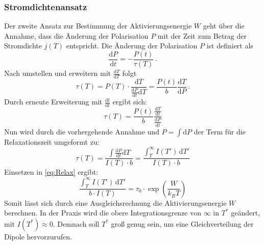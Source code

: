 \subsubsection{Stromdichtenansatz}
Der zweite Ansatz zur Bestimmung der Aktivierungsenergie $W$ geht über die Annahme,
dass die Änderung der Polarisation $P$ mit der Zeit zum Betrag der Stromdichte $j(T)$
entspricht.
Die Änderung der Polarisation $P$ ist definiert als
\begin{equation*}
    \frac{\text{d}P}{\text{d}t} = -\frac{P(t)}{\tau(T)}\, .
\end{equation*}
Nach umstellen und erweitern mit $\frac{\text{d}T}{\text{d}T}$ folgt 
\begin{equation*}
    \tau(T) = P(T) \cdot \frac{\text{d}T}{\frac{\text{d}P}{\text{d}t}\text{d}T } =  \frac{P(t)}{b} \frac{\text{d}T}{\text{d}P}\,.
\end{equation*}
Durch erneute Erweiterung mit $\frac{\text{d}t}{\text{d}t}$ ergibt sich:
\begin{equation*}
    \tau(T) = \frac{P(t)}{b} \frac{\frac{\text{d}T}{\text{d}t}}{\frac{\text{d}P}{\text{d}t}}
\end{equation*}
Nun wird durch die vorhergehende Annahme und $P =\int\text{d}P$ der Term für die Relaxationszeit umgeformt zu: 
\begin{equation*}
    \tau(T) = \frac{\int \frac{\text{d}P}{\text{d}t} \text{d}T}{I(T) \cdot b} = \frac{\int_T^\infty I(T') \, \text{d}T'}{I(T) \cdot b}
\end{equation*}
Einsetzen in \autoref{eq:Relax} ergibt:
\begin{equation}
    \frac{\int_T^\infty I(T') \, \text{d}T'}{b \cdot I(T)} = \tau_0 \cdot \exp \left(\frac{W}{k_B T}\right)
    \label{eq:Int}
\end{equation}
Somit lässt sich durch eine Ausgleichsrechnung die Aktivierungsenergie $W$ berechnen. In der Praxis wird die obere Integrationsgrenze von $\infty$ in $T^*$ geändert, mit
$I\left(T^*\right)\approx 0$. Demnach soll $T^*$ groß genug sein, um eine Gleichverteilung der Dipole hervorzurufen. 